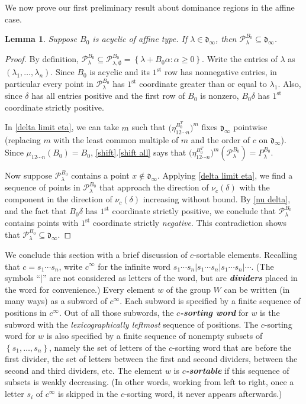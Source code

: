 \documentclass{amsart}
\newtheorem{lemma}[proposition]{Lemma}
\theoremstyle{definition}
\theoremstyle{remark}
\numberwithin{equation}{section}
\newcommand{\newword}[1]{\textbf{\emph{#1}}}
\newcommand{\set}[1]{{\left\lbrace #1 \right\rbrace}}
\newcommand{\st}{^\mathrm{st}}
\newcommand{\0}{{\mathbf{0}}}
\renewcommand{\P}{\mathcal{P}}
\renewcommand{\d}{{\mathfrak d}}
\begin{document}
We now prove our first preliminary result about dominance regions in the affine case.

\begin{lemma}\label{P in dinf}
Suppose $B_0$ is acyclic of affine type.
If $\lambda\in\d_\infty$, then $\P^{B_0}_\lambda\subseteq\d_\infty$.
\end{lemma}
\begin{proof}
By definition, $\P^{B_0}_\lambda\subseteq\P^{B_0}_{\lambda,\emptyset}=\set{\lambda+B_0\alpha:\alpha\ge0}$.
Write the entries of $\lambda$ as $(\lambda_1,\ldots,\lambda_n)$.
Since $B_0$ is acyclic and its $1\st$ row has nonnegative entries, in particular every point in $\P^{B_0}_\lambda$ has $1\st$ coordinate greater than or equal to $\lambda_1$.
Also, since $\delta$ has all entries positive and the first row of $B_0$ is nonzero, $B_0\delta$ has $1\st$ coordinate strictly positive.

In \cref{delta limit eta}, we can take $m$ such that $\bigl(\eta^{B_0^T}_{12\cdots n}\bigr)^m$ fixes $\d_\infty$ pointwise (replacing $m$ with the least common multiple of $m$ and the order of $c$ on $\d_\infty$).
Since $\mu_{12\cdots n}(B_0)=B_0$, \cref{shift}.\ref{shift all} says that $\bigl(\eta^{B_0^T}_{12\cdots n}\bigr)^m(\P_\lambda^{B_0})=P_\lambda^{B_0}$.

Now suppose $\P^{B_0}_\lambda$ contains a point $x\not\in\d_\infty$.
Applying \cref{delta limit eta}, we find a sequence of points in $\P^{B_0}_\lambda$ that approach the direction of $\nu_c(\delta)$ with the component in the direction of $\nu_c(\delta)$ increasing without bound.
By \cref{nu delta}, and the fact that $B_0\delta$ has $1\st$ coordinate strictly positive, we conclude that $\P^{B_0}_\lambda$ contains points with $1\st$ coordinate strictly \emph{negative}.
This contradiction shows that $\P^{B_0}_\lambda\subseteq\d_\infty$.
\end{proof}

We conclude this section with a brief discussion of $c$-sortable elements.  
Recalling that $c=s_1\cdots s_n$, write $c^\infty$ for the infinite word $s_1\cdots s_n|s_1\cdots s_n|s_1\cdots s_n|\cdots$.
(The symbols ``$|$'' are not considered as letters of the word, but are \newword{dividers} placed in the word for convenience.)
Every element $w$ of the group $W$ can be written (in many ways) as a subword of $c^\infty$.
Each subword is specified by a finite sequence of positions in $c^\infty$.
Out of all those subwords, the \newword{$c$-sorting word} for $w$ is the subword with the \emph{lexicographically leftmost} sequence of positions.
The $c$-sorting word for $w$ is also specified by a finite sequence of nonempty subsets of $\set{s_1,\ldots,s_n}$, namely the set of letters of the $c$-sorting word that are before the first divider, the set of letters between the first and second dividers, between the second and third dividers, etc.
The element $w$ is \newword{$c$-sortable} if this sequence of subsets is weakly decreasing.
(In other words, working from left to right, once a letter $s_i$ of $c^\infty$ is skipped in the $c$-sorting word, it never appears afterwards.)
\end{document}
